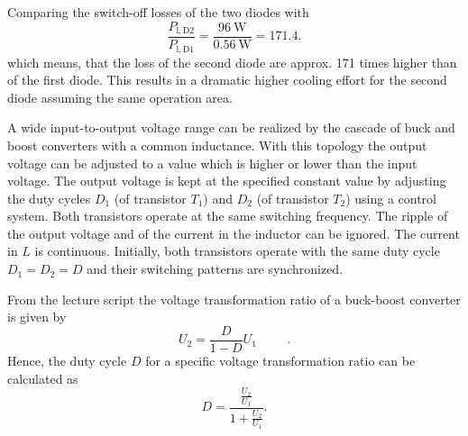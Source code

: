\begin{solutionblock}
	Comparing the switch-off losses of the two diodes with
	\begin{equation}
		\frac{P_{\mathrm{l,D2}}}{P_{\mathrm{l,D1}}} = \frac{\SI{96}{\watt}}{\SI{0.56}{\watt}} = 171.4.
	\end{equation}
	which means, that the loss of the second diode are approx. 171 times higher than of the first diode. This results in a dramatic higher cooling effort for the second diode assuming the same operation area.

\end{solutionblock}


A wide input-to-output voltage range can be realized by the cascade of buck and boost converters with a common inductance.
With this topology the output voltage can be adjusted to a value which is higher or lower than the input voltage.
The output voltage is kept at the specified constant value by adjusting the duty cycles $D_1$
(of transistor  $T_1$) and $D_2$ (of transistor $T_2$) using a control system. Both transistors operate at the same switching frequency.
The ripple of the output voltage and of the current in the inductor can be ignored. The current in $L$ is continuous.
Initially, both transistors operate with the same duty cycle $D_1 = D_2 = D$ and their switching patterns are synchronized.


%



\begin{solutionblock}
	From the lecture script the voltage transformation ratio of a buck-boost converter is given by
	\begin{equation}
		U_\mathrm{2}=\frac{D}{1-D} U_\mathrm{1}
		\hspace{1cm}.
	\end{equation}
	Hence, the duty cycle $D$ for a specific voltage transformation ratio can be calculated as
	\begin{equation}
		D = \frac{\frac{U_\mathrm{2}}{U_\mathrm{1}}} {1+{\frac{U_\mathrm{2}}{U_\mathrm{1}}}}.
		\label{eq:DutyCycle}
	\end{equation}
\end{solutionblock}

